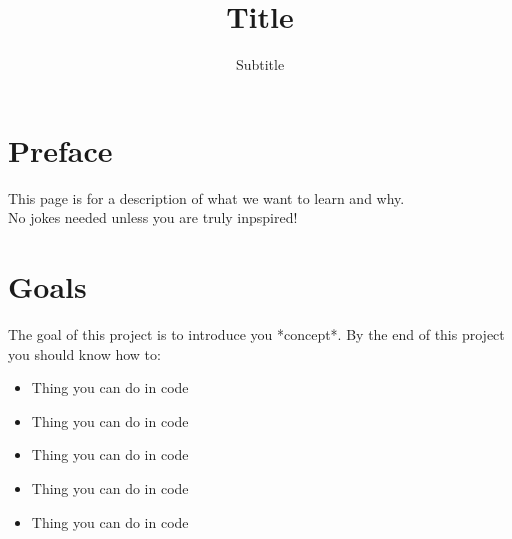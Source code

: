 \documentclass{42-en}
\begin{document}
\title{Title}
\subtitle{Subtitle}


\maketitle

\tableofcontents

\chapter{Preface}

This page is for a description of what we want to learn and why.\\

No jokes needed unless you are truly inpspired!


\chapter{Goals}

	The goal of this project is to introduce you *concept*.
	By the end of this project you should know how to:\\
	
	\begin{itemize}
		\item Thing you can do in code
		\item Thing you can do in code
		\item Thing you can do in code
		\item Thing you can do in code
		\item Thing you can do in code
	\end{itemize}
	 
\end{document}
